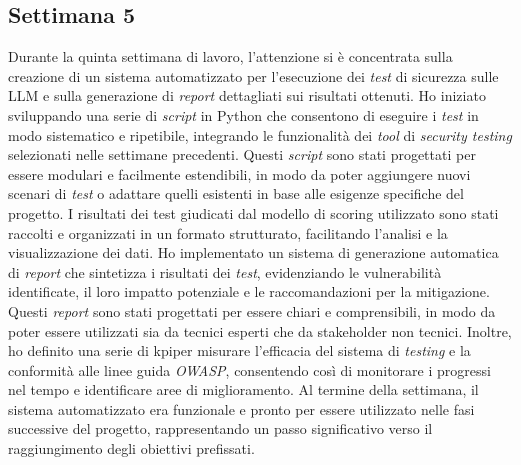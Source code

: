 \subsection{Settimana 5}
Durante la quinta settimana di lavoro, l'attenzione si è concentrata sulla creazione di un sistema automatizzato per l'esecuzione dei \emph{test} di sicurezza sulle LLM e sulla generazione di \emph{report} dettagliati sui risultati ottenuti. Ho iniziato sviluppando una serie di \emph{script} in Python che consentono di eseguire i \emph{test} in modo sistematico e ripetibile, integrando le funzionalità dei \emph{tool} di \emph{security testing} selezionati nelle settimane precedenti. Questi \emph{script} sono stati progettati per essere modulari e facilmente estendibili, in modo da poter aggiungere nuovi scenari di \emph{test} o adattare quelli esistenti in base alle esigenze specifiche del progetto. I risultati dei test giudicati dal modello di scoring utilizzato sono stati raccolti e organizzati in un formato strutturato, facilitando l'analisi e la visualizzazione dei dati. Ho implementato un sistema di generazione automatica di \emph{report} che sintetizza i risultati dei \emph{test}, evidenziando le vulnerabilità identificate, il loro impatto potenziale e le raccomandazioni per la mitigazione. Questi \emph{report} sono stati progettati per essere chiari e comprensibili, in modo da poter essere utilizzati sia da tecnici esperti che da stakeholder non tecnici. Inoltre, ho definito una serie di \gls{kpi}\glsfirstoccur per misurare l'efficacia del sistema di \emph{testing} e la conformità alle linee guida \emph{OWASP}, consentendo così di monitorare i progressi nel tempo e identificare aree di miglioramento. Al termine della settimana, il sistema automatizzato era funzionale e pronto per essere utilizzato nelle fasi successive del progetto, rappresentando un passo significativo verso il raggiungimento degli obiettivi prefissati.
\newpage
